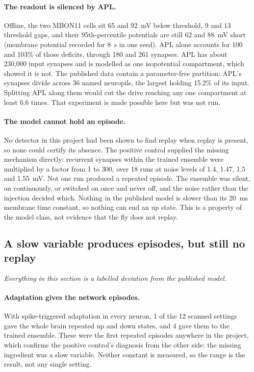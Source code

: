 \documentclass[11pt]{article}
\begin{document}
\paragraph{The readout is silenced by APL.} Offline, the two MBON11 cells sit 65 and 92~mV below threshold, 9 and 13 threshold gaps, and their 95th-percentile potentials are still 62 and 88~mV short (membrane potential recorded for 8~s in one seed). APL alone accounts for 100 and 103\% of those deficits, through 180 and 261 synapses. APL has about 230,000 input synapses and is modelled as one isopotential compartment, which \citet{amin2020} showed it is not. The published data contain a parameter-free partition: APL's synapses divide across 36 named neuropils, the largest holding 15.2\% of its input. Splitting APL along them would cut the drive reaching any one compartment at least 6.6 times. That experiment is made possible here but was not run.

\paragraph{The model cannot hold an episode.} No detector in this project had been shown to find replay when replay is present, so none could certify its absence. The positive control supplied the missing mechanism directly: recurrent synapses within the trained ensemble were multiplied by a factor from 1 to 300, over 18 runs at noise levels of 1.4, 1.47, 1.5 and 1.55~mV. Not one run produced a repeated episode. The ensemble was silent, on continuously, or switched on once and never off, and the noise rather than the injection decided which. Nothing in the published model is slower than its 20~ms membrane time constant, so nothing can end an up state. This is a property of the model class, not evidence that the fly does not replay.

\subsection{A slow variable produces episodes, but still no replay}\label{sec:slow}
\emph{Everything in this section is a labelled deviation from the published model.}

\paragraph{Adaptation gives the network episodes.} With spike-triggered adaptation in every neuron, 1 of the 12 scanned settings gave the whole brain repeated up and down states, and 4 gave them to the trained ensemble. These were the first repeated episodes anywhere in the project, which confirms the positive control's diagnosis from the other side: the missing ingredient was a slow variable. Neither constant is measured, so the range is the result, not any single setting.
\end{document}
